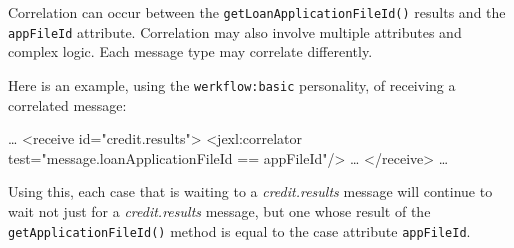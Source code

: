 Correlation can occur between the \verb|getLoanApplicationFileId()|
results and the \verb|appFileId| attribute.  Correlation may also
involve multiple attributes and complex logic.  Each message
type may correlate differently.

Here is an example, using the \verb|werkflow:basic| personality, of 
receiving a correlated message:

\begin{codelisting}
\dots
<receive id="credit.results">
    <jexl:correlator test="message.loanApplicationFileId == appFileId"/>
    \dots
</receive>
\dots
\end{codelisting}

Using this, each case that is waiting to  a
\emph{credit.results} message will continue to wait
not just for a \emph{credit.results} message, but
one whose result of the \verb|getApplicationFileId()|
method is equal to the case attribute \verb|appFileId|.

